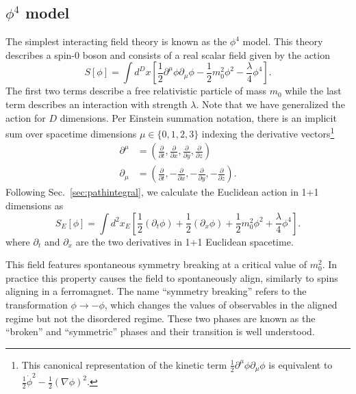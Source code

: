 \documentclass[12pt]{report}
\begin{document}
\subsection{$\phi^4$ model}
\label{sec:phi4}

The simplest interacting field theory is known as the $\phi^4$ model. This theory describes a spin-0 boson and consists of a real scalar field given by the action
\begin{equation}
    \label{eq:phi4 action}
    S[\phi] = \int d^D x \left[ \frac{1}{2}\partial^\mu \phi \partial_\mu\phi - \frac{1}{2} m_0^2 \phi^2 - \frac{\lambda}{4}\phi^4\right].
\end{equation}
The first two terms describe a free relativistic particle of mass $m_0$ while the last term describes an interaction with strength $\lambda$. Note that we have generalized the action for $D$ dimensions. Per Einstein summation notation, there is an implicit sum over spacetime dimensions $\mu\in\{0,1,2,3\}$ indexing the derivative vectors\footnote{This canonical representation of the kinetic term $\frac{1}{2}\partial^\mu\phi\partial_\mu\phi$ is equivalent to $\frac{1}{2}\dot\phi^2-\frac{1}{2}\left(\nabla \phi\right)^2$.}
\begin{align*}
    \partial^\mu &= \left( \frac{\partial}{\partial t}, \frac{\partial}{\partial x},\frac{\partial}{\partial y}, \frac{\partial}{\partial z} \right) \\
    \partial_\mu &= \left( \frac{\partial}{\partial t}, -\frac{\partial}{\partial x}, -\frac{\partial}{\partial y}, -\frac{\partial}{\partial z} \right).
\end{align*}
Following Sec.~\ref{sec:pathintegral}, we calculate the Euclidean action in 1+1 dimensions as 
\begin{equation}
    \label{eq:phi4 euclidean action}
    S_E[\phi] = \int d^2 x_E \left[\frac{1}{2}\left(\partial_t \phi\right) + \frac{1}{2} \left(\partial_x \phi \right) + \frac{1}{2} m_0^2 \phi^2 + \frac{\lambda}{4}\phi^4\right].
\end{equation}
where $\partial_t$ and $\partial_x$ are the two derivatives in 1+1 Euclidean spacetime. 

This field features spontaneous symmetry breaking at a critical value of $m_0^2$. In practice this property causes the field to spontaneously align, similarly to spins aligning in a ferromagnet. The name ``symmetry breaking'' refers to the transformation $\phi\rightarrow-\phi$, which changes the values of observables in the aligned regime but not the disordered regime. These two phases are known as the ``broken'' and ``symmetric'' phases and their transition is well understood.
\end{document}
